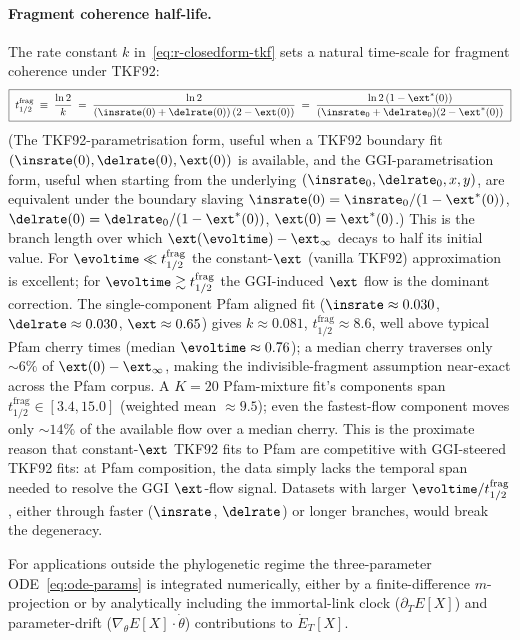 \paragraph{Fragment coherence half-life.}
The rate constant $k$ in~\eqref{eq:r-closedform-tkf} sets a natural
time-scale for fragment coherence under TKF92:
\begin{equation}
\label{eq:t-half}
\boxed{\;t_{1/2}^{\mathrm{frag}} \;\equiv\; \frac{\ln 2}{k}
  \;=\; \frac{\ln 2}{(\insrate(0)+\delrate(0))\,(2-\fragext(0))}
  \;=\; \frac{\ln 2\,(1-\fragext^\ast(0))}
              {(\insrate_0+\delrate_0)(2-\fragext^\ast(0))}\;}
\end{equation}
(The TKF92-parametrisation form, useful when a TKF92 boundary fit
$(\insrate(0),\delrate(0),\fragext(0))$ is available, and the
GGI-parametrisation form, useful when starting from the underlying
$(\insrate_0,\delrate_0,x,y)$, are equivalent under the boundary slaving
$\insrate(0)=\insrate_0/(1-\fragext^\ast(0))$,
$\delrate(0)=\delrate_0/(1-\fragext^\ast(0))$,
$\fragext(0)=\fragext^\ast(0)$.)
This is the branch length over which $\fragext(\evoltime)-\fragext_\infty$
decays to half its initial value.  For $\evoltime \ll t_{1/2}^{\mathrm{frag}}$
the constant-$\fragext$ (vanilla TKF92) approximation is excellent;
for $\evoltime \gtrsim t_{1/2}^{\mathrm{frag}}$ the
GGI-induced $\fragext$ flow is the dominant correction.
The single-component Pfam aligned fit
($\insrate\approx 0.030$, $\delrate\approx 0.030$, $\fragext\approx 0.65$)
gives $k\approx 0.081$, $t_{1/2}^{\mathrm{frag}}\approx 8.6$, well above
typical Pfam cherry times (median $\evoltime\approx 0.76$); a median
cherry traverses only $\sim 6\%$ of $\fragext(0)-\fragext_\infty$,
making the indivisible-fragment assumption near-exact across the Pfam
corpus.  A $K\!=\!20$ Pfam-mixture fit's components span
$t_{1/2}^{\mathrm{frag}}\in[3.4, 15.0]$
(weighted mean $\approx 9.5$); even the fastest-flow component
moves only $\sim 14\%$ of the available flow over a median cherry.
This is the proximate reason that constant-$\fragext$ TKF92 fits to
Pfam are competitive with GGI-steered TKF92 fits: at Pfam composition,
the data simply lacks the temporal span needed to resolve the GGI
$\fragext$-flow signal.  Datasets with larger $\evoltime/t_{1/2}^{\mathrm{frag}}$,
either through faster ($\insrate$, $\delrate$) or longer branches, would
break the degeneracy.

For applications outside the phylogenetic regime the three-parameter
ODE~\eqref{eq:ode-params} is integrated numerically, either by a
finite-difference $m$-projection or by analytically including the
immortal-link clock ($\partial_T E[X]$) and parameter-drift
($\nabla_\theta E[X]\cdot\dot\theta$) contributions to $\dot E_T[X]$.

